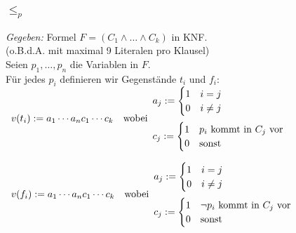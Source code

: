 \documentclass[aspectratio=1610,onlymath]{beamer}
\begin{document}
\begin{frame}
  \frametitle{ $\leq_p$ }
    \emph{Gegeben: } Formel $F = (C_1 \wedge \dots \wedge C_k)$ in
  KNF.\\
  (o.B.d.A. mit maximal 9 Literalen pro Klausel)\pause\\[1ex]
  Seien $p_1, \dots, p_n$ die Variablen in $F$.\\
  Für jedes $p_i$ definieren wir Gegenstände $t_i$ und $f_i$:\\[10pt]

  $\begin{array}{ll}
    v(t_i) := a_1 \cdots a_n c_1 \cdots c_k & {\text{wobei}}
    \begin{array}{l}
      a_j :=
      \begin{cases}
        1 & i=j\\
        0 & i\not=j
      \end{cases}\\[15pt]
      c_j :=
      \begin{cases}
        1 & p_i \text{ kommt in } C_j\text{ vor}\\
        0 & \text{sonst}
      \end{cases}
    \end{array}
  \end{array}$

  \bigskip\pause

  $\begin{array}{ll}
    v(f_i) := a_1 \cdots a_n c_1 \cdots c_k & \text{wobei} 
    \begin{array}{l}
      a_j :=
      \begin{cases}
        1 & i=j\\
        0 & i\not=j
      \end{cases}\\[15pt]
      c_j :=
      \begin{cases}
        1 & {\neg p_i} \text{ kommt in } C_j\text{ vor}\\
        0 & \text{sonst}
      \end{cases}
    \end{array}
  \end{array}$
\end{frame}

\end{document}

